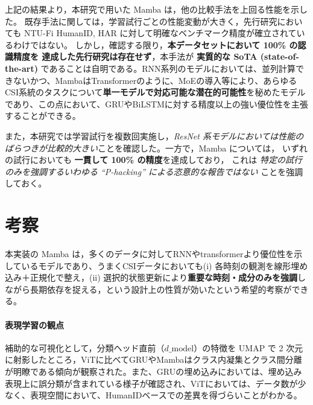 \documentclass[11pt]{ltjsarticle}
\begin{document}
\begin{table}[H]
  \centering
  \caption{各モデルの検証精度と損失（左：HumanID，右：HAR）}
  \label{tab:results}

  \begin{minipage}{0.48\linewidth}
    \centering
    \label{tab:results_hid}
    
  \end{minipage}
  \hfill
  \begin{minipage}{0.48\linewidth}
    \centering
    \label{tab:results_har}
    
  \end{minipage}

\end{table}


上記の結果より，本研究で用いた Mamba は，他の比較手法を上回る性能を示した。
既存手法に関しては，学習試行ごとの性能変動が大きく，先行研究においても
NTU-Fi HumanID, HAR に対して明確なベンチマーク精度が確立されているわけではない。
しかし，確認する限り，\textbf{本データセットにおいて 100\% の認識精度を
達成した先行研究は存在せず}，本手法が \textbf{実質的な SoTA (state-of-the-art)}
であることは自明である。RNN系列のモデルにおいては、並列計算できないかつ、MambaはTransformerのように、MoEの導入等により、あらゆるCSI系統のタスクについて\textbf{単一モデルで対応可能な潜在的可能性}を秘めたモデルであり、この点において、GRUやBiLSTMに対する精度以上の強い優位性を主張することができる。

また，本研究では学習試行を複数回実施し，\emph{ResNet 系モデルにおいては性能の
ばらつきが比較的大きい}ことを確認した。一方で，Mamba については，
いずれの試行においても \textbf{一貫して 100\% の精度}を達成しており，
これは \emph{特定の試行のみを強調するいわゆる ``P-hacking'' による恣意的な報告ではない}
ことを強調しておく。

\section{考察}
本実装の Mamba は，多くのデータに対してRNNやtransformerより優位性を示しているモデルであり、うまくCSIデータにおいても(i) 各時刻の観測を線形埋め込み＋正規化で整え，(ii) 選択的状態更新により\textbf{重要な時刻・成分のみを強調}しながら長期依存を捉える，という設計上の性質が効いたという希望的考察ができる。

\paragraph{表現学習の観点}
補助的な可視化として，分類ヘッド直前（\(d\_\mathrm{model}\)）の特徴を UMAP で 2 次元に射影したところ，ViTに比べてGRUやMambaはクラス内凝集とクラス間分離が明瞭である傾向が観察された。また、GRUの埋め込みにおいては、埋め込み表現上に誤分類が含まれている様子が確認され、ViTにおいては、データ数が少なく、表現空間において、HumanIDベースでの差異を得づらいことがわかる。
\end{document}
